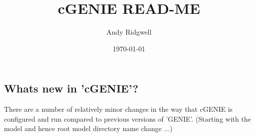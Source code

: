 \documentclass[10pt,twoside]{article}
\title{cGENIE READ-ME}
\author{Andy Ridgwell}
\date{\today}
\begin{document}

\maketitle







\subsection{Whats new in 'cGENIE'?}\label{Whats new in 'cGENIE'?}

There are a number of relatively minor changes in the way that cGENIE is configured and run compared to previous versions of 'GENIE'. (Starting with the model and hence root model directory name change ...)
\end{document}
